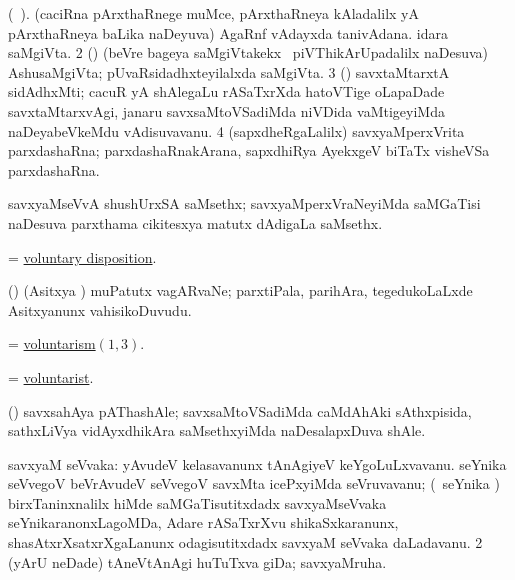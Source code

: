 \bentry 
{} 
\gl{\nA}(\bava\ ). 
\bmng
\bnum
{} 
\banum
{} (caciRna pArxthaRnege muMce, pArxthaRneya kAladalilx yA pArxthaRneya baLika naDeyuva) AgaRnf vAdayxda tanivAdana. 
 idara saMgiVta. 
\eanum
\numie
\num{2} (\pArxparx) (beVre bageya saMgiVtakekx \kanmu\ piVThikArUpadalilx naDesuva) AshusaMgiVta; pUvaRsidadhxteyilalxda saMgiVta. 
\num{3} (\ca) savxtaMtarxtA sidAdhxMti; cacuR yA shAlegaLu rASaTxrXda hatoVTige oLapaDade savxtaMtarxvAgi, janaru savxsaMtoVSadiMda niVDida vaMtigeyiMda naDeyabeVkeMdu vAdisuvavanu. 
\num{4} (sapxdheRgaLalilx) savxyaMperxVrita parxdashaRna; parxdashaRnakArana, sapxdhiRya AyekxgeV biTaTx visheVSa parxdashaRna. 
\enum
\emng
\eentry
 
\bentry
{}
\gl{\nA}
\expl{}
\bmng
 savxyaMseVvA shushUrxSA saMsethx; savxyaMperxVraNeyiMda saMGaTisi naDesuva parxthama cikitesxya matutx dAdigaLa saMsethx. 
\emng
\eentry

\bentry 
{}
\gl{\nA}
\expl{}
\bmng
 = \hyperlink{voluntary disposition}{voluntary disposition}. 
\emng
\eentry

\bentry
{}
\gl{\nA}
\expl{}
\bmng
 (\nAyxshA) (Asitxya \vi) muPatutx vagARvaNe; parxtiPala, parihAra, tegedukoLaLxde Asitxyanunx vahisikoDuvudu. 
\emng
\eentry

\bentry
{} 
\gl{\nA}
\expl{}
\bmng
 = \hyperlink{voluntarism(1)}{voluntarism\((1, 3)\)}. 
\emng
\eentry

\bentry 
{} 
\gl{\nA}
\expl{}
\bmng
 = \hyperlink{voluntarist}{voluntarist}. 
\emng
\eentry

\bentry 
{}
\gl{\nA}
\expl{}
\bmng
 (\birx) savxsahAya pAThashAle; savxsaMtoVSadiMda caMdAhAki sAthxpisida, sathxLiVya vidAyxdhikAra saMsethxyiMda naDesalapxDuva shAle. 
\emng
\eentry

\bentry 
{} 
\gl{\nA}
\expl{}
\bmng
\bnum
{} savxyaM seVvaka: 
\banum
{} yAvudeV kelasavanunx tAnAgiyeV keYgoLuLxvavanu. 
 seYnika seVvegoV beVrAvudeV seVvegoV savxMta icePxyiMda seVruvavanu; (\kanmu\ seYnika \ca) birxTaninxnalilx hiMde saMGaTisutitxdadx savxyaMseVvaka seYnikaranonxLagoMDa, Adare rASaTxrXvu shikaSxkaranunx, shasAtxrXsatxrXgaLanunx odagisutitxdadx savxyaM seVvaka daLadavanu. 
\eanum
\numie
\num{2} (yArU neDade) tAneVtAnAgi huTuTxva giDa; savxyaMruha. 
\enum
\emng
\eentry

